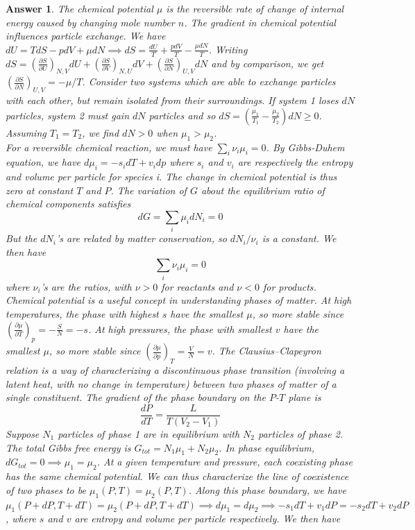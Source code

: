 \documentclass[a4paper]{article}
\theoremstyle{new2}
\newtheorem{ans}{Answer}[section]
\theoremstyle{new}
\begin{document}
\begin{ans}
The chemical potential $\mu$ is the reversible rate of change of internal energy caused by changing mole number $n$. The gradient in chemical potential influences particle exchange. We have $dU=TdS-pdV+\mu dN\implies dS=\frac{dU}{T}+\frac{pdV}{T}-\frac{\mu dN}{T}$. Writing $dS=(\frac{\partial S}{\partial U})_{N,V}dU+(\frac{\partial S}{\partial V})_{N,U}dV+(\frac{\partial S}{\partial N})_{U,V}dN$ and by comparison, we get $(\frac{\partial S}{\partial N})_{U,V}=-\mu/T$. Consider two systems which are able to exchange particles with each other, but remain isolated from their surroundings. If system 1 loses $dN$ particles, system 2 must gain $dN$ particles and so $dS=(\frac{\mu_1}{T_1}-\frac{\mu_2}{T_2})dN\geq0$. Assuming $T_1=T_2$, we find $dN>0$ when $\mu_1>\mu_2$.\\[5pt]
For a reversible chemical reaction, we must have $\sum_i\nu_i\mu_i=0$. By Gibbs-Duhem equation, we have $d\mu_i=-s_idT+v_idp$ where $s_i$ and $v_i$ are respectively the entropy and volume per particle for species i. The change in chemical potential is thus zero at constant $T$ and $P$. The variation of $G$ about the equilibrium ratio of chemical components satisfies
$$dG=\sum_i\mu_idN_i=0$$
But the $dN_i$'s are related by matter conservation, so $dN_i/\nu_i$ is a constant. We then have 
$$\sum_i\nu_i\mu_i=0$$
where $\nu_i$'s are the ratios, with $\nu>0$ for reactants and $\nu<0$ for products.\\[5pt]
Chemical potential is a useful concept in understanding phases of matter. At high temperatures, the phase with highest $s$ have the smallest $\mu$, so more stable since $(\frac{\partial\mu}{\partial T})_p=-\frac{S}{N}=-s$. At high pressures, the phase with smallest $v$ have the smallest $\mu$, so more stable since $(\frac{\partial\mu}{\partial p})_T=\frac{V}{N}=v$. The Clausius–Clapeyron relation is a way of characterizing a discontinuous phase transition (involving a latent heat, with no change in temperature) between two phases of matter of a single constituent. The gradient of the phase boundary on the $P$-$T$ plane is
$$\frac{dP}{dT}=\frac{L}{T(V_2-V_1)}$$ 
Suppose $N_1$ particles of phase 1 are in equilibrium with $N_2$ particles of phase 2. The total Gibbs free energy is $G_{tot}=N_1\mu_1+N_2\mu_2$. In phase equilibrium, $dG_{tot}=0\implies\mu_1=\mu_2$. At a given temperature and pressure, each coexisting phase has the same chemical potential. We can thus characterize the line of coexistence of two phases to be $\mu_1(P,T)=\mu_2(P,T)$. Along this phase boundary, we have $\mu_1(P+dP,T+dT)=\mu_2(P+dP,T+dT)\implies d\mu_1=d\mu_2\implies -s_1dT+v_1dP=-s_2dT+v_2dP$, where $s$ and $v$ are entropy and volume per particle respectively. We then have 

\end{ans}
\end{document}
